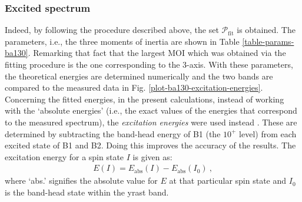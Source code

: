 \subsubsection*{Excited spectrum}

Indeed, by following the procedure described above, the set $\mathcal{P}_\text{fit}$ is obtained. The parameters, i.e., the three moments of inertia are shown in Table \ref{table-params-ba130}. Remarking that fact that the largest MOI which was obtained via the fitting procedure is the one corresponding to the $3$-axis. With these parameters, the theoretical energies are determined numerically and the two bands are compared to the measured data in Fig. \ref{plot-ba130-excitation-energies}. Concerning the fitted energies, in the present calculations, instead of working with the `absolute energies' (i.e., the exact values of the energies that correspond to the measured spectrum), the \emph{excitation energies} were used instead \cite{raduta2017semiclassical,raduta2018wobbling,raduta2020towards}. These are determined by subtracting the band-head energy of B1 (the $10^+$ level) from each excited state of B1 and B2. Doing this improves the accuracy of the results. The excitation energy for a spin state $I$ is given as:
\begin{align}
    E(I)=E_\text{abs}(I)-E_\text{abs}(I_0)\ ,
    \label{excitation-energy-general-formula}
\end{align}
where `abs.' signifies the absolute value for $E$ at that particular spin state and $I_0$ is the band-head state within the yrast band.



